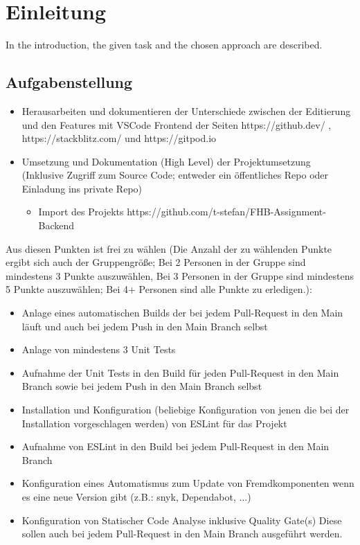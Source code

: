 \section{Einleitung}
In the introduction, the given task and the chosen approach are described.

\subsection{Aufgabenstellung}

\begin{itemize}
	\item Herausarbeiten und dokumentieren der Unterschiede zwischen der Editierung und den
	Features mit VSCode Frontend der Seiten https://github.dev/ , https://stackblitz.com/ und
	https://gitpod.io
	\item Umsetzung und Dokumentation (High Level) der Projektumsetzung (Inklusive Zugriff zum
	Source Code; entweder ein öffentliches Repo oder Einladung ins private Repo)
	\begin{itemize}
		\item Import des Projekts https://github.com/t-stefan/FHB-Assignment-Backend
	\end{itemize}
\end{itemize}

\noindent
Aus diesen Punkten ist frei zu wählen (Die Anzahl der zu wählenden Punkte ergibt sich auch der
Gruppengröße; Bei 2 Personen in der Gruppe sind mindestens 3 Punkte auszuwählen, Bei 3
Personen in der Gruppe sind mindestens 5 Punkte auszuwählen; Bei 4+ Personen sind alle Punkte zu
erledigen.): 

\begin{itemize}
	\item Anlage eines automatischen Builds der bei jedem Pull-Request in den Main läuft und
	auch bei jedem Push in den Main Branch selbst
	\item Anlage von mindestens 3 Unit Tests
	\item Aufnahme der Unit Tests in den Build für jeden Pull-Request in den Main Branch
	sowie bei jedem Push in den Main Branch selbst
	\item Installation und Konfiguration (beliebige Konfiguration von jenen die bei der
	Installation vorgeschlagen werden) von ESLint für das Projekt
	\item Aufnahme von ESLint in den Build bei jedem Pull-Request in den Main Branch
	\item Konfiguration eines Automatismus zum Update von Fremdkomponenten wenn es
	eine neue Version gibt (z.B.: snyk, Dependabot, ...)
	\item Konfiguration von Statischer Code Analyse inklusive Quality Gate(s)
	Diese sollen auch bei jedem Pull-Request in den Main Branch ausgeführt werden.
\end{itemize}

\clearpage

